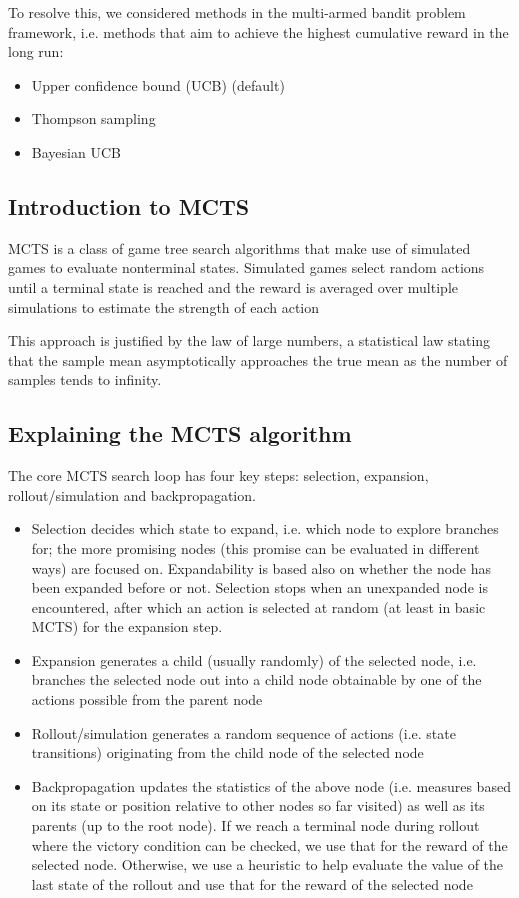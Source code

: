 \documentclass[conference]{IEEEtran}
\begin{document}
To resolve this, we considered methods in the multi-armed bandit problem framework, i.e. methods that aim to achieve the highest cumulative reward in the long run:

\begin{itemize}
\item Upper confidence bound (UCB) (default)
\item Thompson sampling
\item Bayesian UCB
\end{itemize}

\subsection{Introduction to MCTS}
MCTS is a class of game tree search algorithms that make use of simulated games to evaluate nonterminal states. Simulated games select random actions until a terminal state is reached and the reward is averaged over multiple simulations to estimate the strength of each action\cite{b3}

This approach is justified by the law of large numbers, a statistical law stating that the sample mean asymptotically approaches the true mean as the number of samples tends to infinity. 

\subsection{Explaining the MCTS algorithm}

The core MCTS search loop has four key steps: selection, expansion, rollout/simulation and backpropagation. 

\begin{itemize}
\item Selection decides which state to expand, i.e. which node to explore branches for; the more promising nodes (this promise can be evaluated in different ways) are focused on. Expandability is based also on whether the node has been expanded before or not. Selection stops when an unexpanded node is encountered, after which an action is selected at random (at least in basic MCTS) for the expansion step.
\item Expansion generates a child (usually randomly) of the selected node, i.e. branches the selected node out into a child node obtainable by one of the actions possible from the parent node
\item Rollout/simulation generates a random sequence of actions (i.e. state transitions) originating from the child node of the selected node
\item Backpropagation updates the statistics of the above node (i.e. measures based on its state or position relative to other nodes so far visited) as well as its parents (up to the root node). If we reach a terminal node during rollout where the victory condition can be checked, we use that for the reward of the selected node. Otherwise, we use a heuristic to help evaluate the value of the last state of the rollout and use that for the reward of the selected node
\end{itemize}
\end{document}
